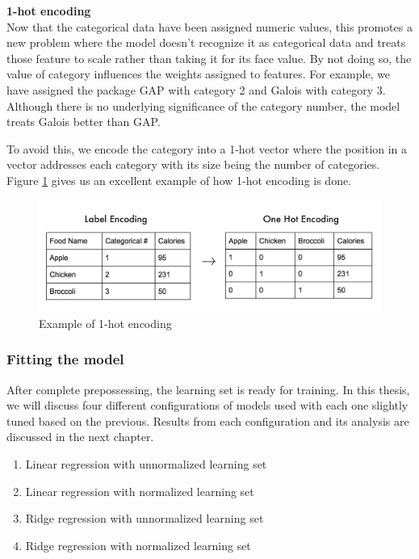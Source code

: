 \textbf{1-hot encoding}\\
Now that the categorical data have been assigned numeric values, this promotes a new problem where the model doesn't recognize it as categorical data and treats those feature to scale rather than taking it for its face value. By not doing so, the value of category influences the weights assigned to features. For example, we have assigned the package GAP with category 2 and Galois with category 3. Although there is no underlying significance of the category number, the model treats Galois better than GAP. 

To avoid this, we encode the category into a 1-hot vector where the position in a vector addresses each category with its size being the number of categories. Figure \ref{Example of 1-hot encoding} gives us an excellent example of how 1-hot encoding is done.


\begin{figure}
    \centering
    \includegraphics[width=1\columnwidth]{figures/preprocess_1_hot.jpeg}
    \caption{Example of 1-hot encoding}
    \label{Example of 1-hot encoding}
\end{figure}

\subsubsection{Fitting the model}
After complete prepossessing, the learning set is ready for training. In this thesis, we will discuss four different configurations of models used with each one slightly tuned based on the previous. Results from each configuration and its analysis are discussed in the next chapter. \\

\begin{enumerate}
    \item Linear regression with unnormalized learning set
    \item Linear regression with normalized learning set
    \item Ridge regression with unnormalized learning set
    \item Ridge regression with normalized learning set
\end{enumerate}
 


